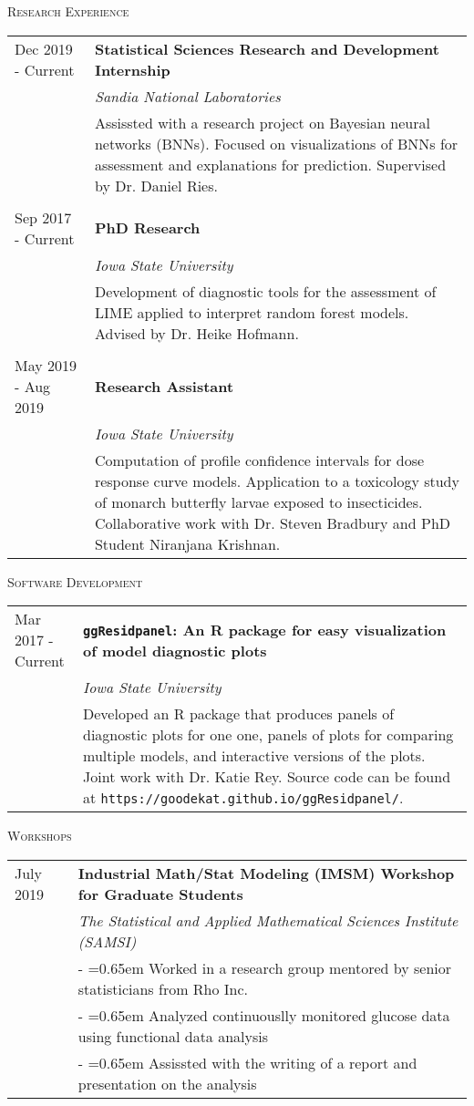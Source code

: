 \documentclass[10pt, oneside]{article}
\begin{document}
\noindent \textsc{Research Experience} \hrulefill

\begin{longtable}{p{3.5cm}p{13cm}}
\hfill{Dec 2019 - Current} & \textbf{Statistical Sciences Research and Development Internship}\\
& \emph{Sandia National Laboratories}\\
& Assissted with a research project on Bayesian neural networks (BNNs). Focused on visualizations of BNNs for assessment and explanations for prediction. Supervised by Dr. Daniel Ries.\\
\\
\hfill{Sep 2017 - Current} & \textbf{PhD Research}\\
& \emph{Iowa State University}\\
& Development of diagnostic tools for the assessment of LIME applied to interpret random forest models. Advised by Dr. Heike Hofmann.\\
\\
\hfill{May 2019 - Aug 2019} & \textbf{Research Assistant}\\
& \emph{Iowa State University}\\
& Computation of profile confidence intervals for dose response curve models. Application to a toxicology study of monarch butterfly larvae exposed to insecticides. Collaborative work with Dr. Steven Bradbury and PhD Student Niranjana Krishnan.
\end{longtable}

\noindent \textsc{Software Development} \hrulefill

\begin{longtable}{p{3.5cm}p{13cm}}
\hfill{Mar 2017 - Current} & \textbf{\texttt{ggResidpanel}: An R package for easy visualization of model diagnostic plots}\\
& \emph{Iowa State University}\\
& Developed an R package that produces panels of diagnostic plots for one one, panels of plots for comparing multiple models, and interactive versions of the plots. Joint work with Dr. Katie Rey. Source code can be found at \texttt{https://goodekat.github.io/ggResidpanel/}.
\end{longtable}

\noindent \textsc{Workshops} \hrulefill
\begin{longtable}{p{3.5cm}p{13cm}}
\hfill{July 2019} & \textbf{Industrial Math/Stat Modeling (IMSM) Workshop for Graduate Students}\\
& \emph{The Statistical and Applied Mathematical Sciences Institute (SAMSI)} \vspace{0.1cm}\\
& - \hangindent=0.65em \hangafter=1 Worked in a research group mentored by senior statisticians from Rho Inc.\\
& - \hangindent=0.65em \hangafter=1 Analyzed continuouslly monitored glucose data using functional data analysis\\
& - \hangindent=0.65em \hangafter=1 Assissted with the writing of a report and presentation on the analysis\\
\end{longtable}
\end{document}
